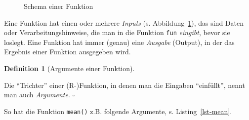 \documentclass[
  letterpaper,
]{scrbook}
\newenvironment{Shaded}{\begin{snugshade}}{\end{snugshade}}
\newcommand{\AttributeTok}[1]{\textcolor[rgb]{0.40,0.45,0.13}{#1}}
\newcommand{\ConstantTok}[1]{\textcolor[rgb]{0.56,0.35,0.01}{#1}}
\newcommand{\DecValTok}[1]{\textcolor[rgb]{0.68,0.00,0.00}{#1}}
\newcommand{\FunctionTok}[1]{\textcolor[rgb]{0.28,0.35,0.67}{#1}}
\newcommand{\NormalTok}[1]{\textcolor[rgb]{0.00,0.23,0.31}{#1}}
\theoremstyle{definition}
\theoremstyle{definition}
\theoremstyle{definition}
\newtheorem{definition}{Definition}[chapter]
\theoremstyle{remark}
\begin{document}
\begin{figure}


\caption{\label{fig-function-schema}Schema einer Funktion}

\end{figure}%

Eine Funktion hat einen oder mehrere \emph{Inputs} (s.
Abbildung~\ref{fig-function-schema}), das sind Daten oder
Verarbeitungshinweise, die man in die Funktion \texttt{fun}
\emph{eingibt}, bevor sie loslegt. Eine Funktion hat immer (genau) eine
\emph{Ausgabe} (Output), in der das Ergebnis einer Funktion ausgegeben
wird.

\begin{definition}[Argumente einer
Funktion]\protect\hypertarget{def-args}{}\label{def-args}

Die \enquote{Trichter} einer (R-)Funktion, in denen man die Eingaben
\enquote{einfüllt}, nennt man auch \emph{Argumente}. \(\square\)

\end{definition}

So hat die Funktion \texttt{mean()} z.B. folgende Argumente, s.
Listing~\ref{lst-mean}.

\begin{codelisting}

\caption{\label{lst-mean}Die Argumente der R-Funktion \texttt{mean}}

\centering{

\begin{Shaded}
\begin{Highlighting}[]
\FunctionTok{mean}\NormalTok{(x, }\AttributeTok{trim =} \DecValTok{0}\NormalTok{, }\AttributeTok{na.rm =} \ConstantTok{FALSE}\NormalTok{, ...)}
\end{Highlighting}
\end{Shaded}

}

\end{codelisting}%
\end{document}
